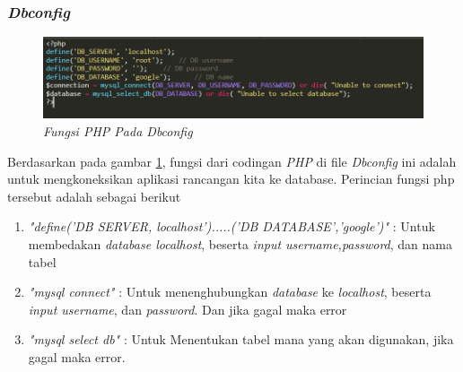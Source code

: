 \subsubsection{\textit{Dbconfig}}
\begin{figure}[!htbp]
    \centering
    \includegraphics[scale=0.5]{gambar/db}
    \caption{\textit{Fungsi \textit{PHP} Pada \textit{Dbconfig}}}
    \label{dbconfig}
\end{figure}
\par 
Berdasarkan pada gambar \ref{dbconfig}, fungsi dari codingan \textit{PHP} di file \textit{Dbconfig} ini adalah untuk mengkoneksikan aplikasi rancangan kita ke database. Perincian fungsi php tersebut adalah sebagai berikut
\begin{enumerate}
\item \textit{"define('DB SERVER, localhost').....('DB DATABASE','google')"} : Untuk membedakan \textit{database localhost}, beserta \textit{input username,password}, dan nama tabel
\item \textit{"mysql connect"} : Untuk menenghubungkan \textit{database} ke \textit{localhost}, beserta \textit{input username}, dan \textit{password}. Dan jika gagal maka error
\item \textit{"mysql select db"} : Untuk Menentukan tabel mana yang akan digunakan, jika gagal maka error.
\end{enumerate}


